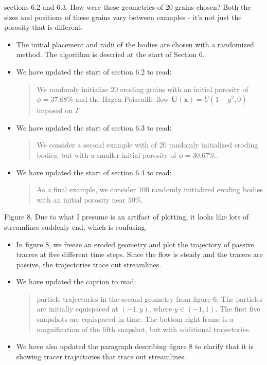 \documentclass[11pt]{article}
\newcommand{\comment}[1]{{\color{blue} #1}}
\begin{document}
\noindent
\comment{sections 6.2 and 6.3.  How were these geometries of 20 grains
chosen?  Both the sizes and positions of these grains vary between
examples - it's not just the porosity that is different.}
\begin{itemize}
  \item The initial placement and radii of the bodies are chosen with a
    randomized method. The algorithm is descried at the start of Section
    6.

  \item We have updated the start of section 6.2 to read:
    \begin{quotation}
      \noindent
      We randomly initialize 20 eroding grains with an initial porosity
      of $\phi = 37.68\%$ and the Hagen-Poiseuille flow
      $\mathbf{U}(\mathbf{x}) = U (1-y^2, 0)$ imposed on $\Gamma$
    \end{quotation}


  \item We have updated the start of section 6.3 to read:
    \begin{quotation}
      \noindent
      We consider a second example with of 20 randomly initialized
      eroding bodies, but with a smaller initial porosity of $\phi =
      30.67\%$.
    \end{quotation}


  \item We have updated the start of section 6.4 to read:
    \begin{quotation}
      \noindent
        As a final example, we consider 100 randomly initialized eroding
        bodies with an initial porosity near $50\%$.
    \end{quotation}

\end{itemize}




\noindent
\comment{Figure 8.  Due to what I presume is an artifact of plotting, it
looks like lots of streamlines suddenly end, which is confusing.}
\begin{itemize}
  \item In figure 8, we freeze an eroded geometry and plot the
    trajectory of passive tracers at five different time steps. Since
    the flow is steady and the tracers are passive, the trajectories
    trace out streamlines.

  \item We have updated the caption to read:
    \begin{quotation}
       particle trajectories in the second geometry from figure 6.
      The particles are initially equispaced at $(−1,y)$, where $y \in
      (−1, 1)$. The first five snapshots are equispaced in time. The
      bottom right frame is a magnification of the fifth snapshot, but
      with additional trajectories.
    \end{quotation}

  \item We have also updated the paragraph describing figure 8 to
    clarify that it is showing tracer trajectories that trace out
    streamlines.
\end{itemize}
\end{document}

